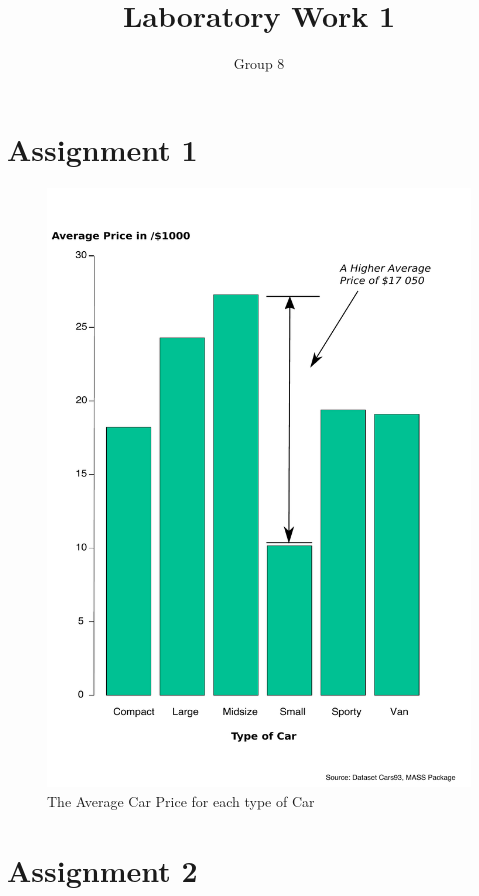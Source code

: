 \documentclass[11pt]{article}
\begin{document}
\author{Group 8}
\title{Laboratory Work 1}
\maketitle

\section*{Assignment 1}

\begin{figure}[H]
  \centering
   \includegraphics[scale=0.4]{Assignment_1.pdf}
   \caption{The Average Car Price for each type of Car}
\end{figure}


\section*{Assignment 2}
\end{document}
